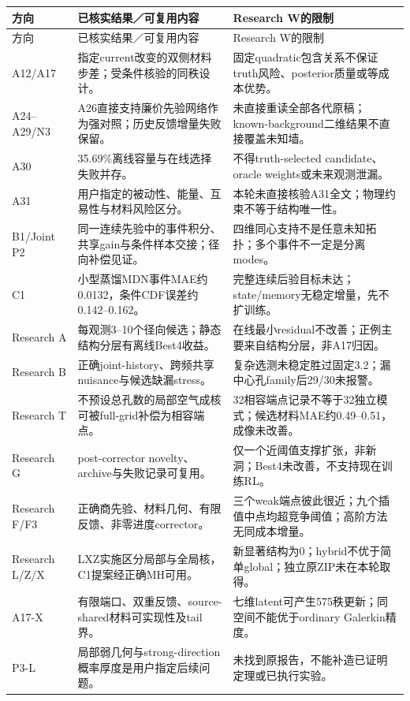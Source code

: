 \begin{longtable}{p{1.7cm}p{5.7cm}p{5.7cm}}
\hline
方向 & 已核实结果／可复用内容 & Research W的限制\\
\hline
\endfirsthead
\hline 方向 & 已核实结果／可复用内容 & Research W的限制\\\hline
\endhead
A12/A17 & 指定current改变的双侧材料步差；受条件核验的同秩设计。 & 固定quadratic包含关系不保证truth风险、posterior质量或等成本优势。\\
A24--A29/N3 & A26直接支持廉价先验网络作为强对照；历史反馈增量失败保留。 & 未直接重读全部各代原稿；known-background二维结果不直接覆盖未知墙。\\
A30 & 35.69\%离线容量与在线选择失败并存。 & 不得truth-selected candidate、oracle weights或未来观测泄漏。\\
A31 & 用户指定的被动性、能量、互易性与材料风险区分。 & 本轮未直接核验A31全文；物理约束不等于结构唯一性。\\
B1/Joint P2 & 同一连续先验中的事件积分、共享gain与条件样本交接；径向补偿见证。 & 四维同心支持不是任意未知拓扑；多个事件不一定是分离modes。\\
C1 & 小型蒸馏MDN事件MAE约0.0132，条件CDF误差约0.142--0.162。 & 完整连续后验目标未达；state/memory无稳定增量，先不扩训练。\\
Research A & 每观测3--10个径向候选；静态结构分层有离线Best4收益。 & 在线最小residual不改善；正例主要来自结构分层，非A17归因。\\
Research B & 正确joint-history、跨频共享nuisance与候选缺漏stress。 & 复杂选测未稳定胜过固定3.2；漏中心孔family后29/30未报警。\\
Research T & 不预设总孔数的局部空气成核可被full-grid补偿为相容端点。 & 32相容端点记录不等于32独立模式；候选材料MAE约0.49--0.51，成像未改善。\\
Research G & post-corrector novelty、archive与失败记录可复用。 & 仅一个近阈值支撑扩张，非新洞；Best4未改善，不支持现在训练RL。\\
Research F/F3 & 正确商先验、材料几何、有限反馈、非零进度corrector。 & 三个weak端点彼此很近；九个插值中点均超竞争阈值；高阶方法无同成本增量。\\
Research L/Z/X & LXZ实施区分局部与全局核，C1提案经正确MH可用。 & 新显著结构为0；hybrid不优于简单global；独立原ZIP未在本轮取得。\\
A17-X & 有限端口、双重反馈、source-shared材料可实现性及tail界。 & 七维latent可产生575秩更新；同空间不能优于ordinary Galerkin精度。\\
P3-L & 局部弱几何与strong-direction概率厚度是用户指定后续问题。 & 未找到原报告，不能补造已证明定理或已执行实验。\\
\hline
\end{longtable}


